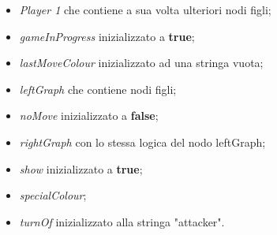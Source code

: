 \documentclass[a4paper,11pt,twoside,openright]{report}
\begin{document}
\begin{itemize}
\item \textit{Player 1} che contiene a sua volta ulteriori nodi figli;

\item \textit{gameInProgress} inizializzato a \textbf{true};

\item \textit{lastMoveColour} inizializzato ad una stringa vuota;

\item \textit{leftGraph} che contiene nodi figli;

\item \textit{noMove} inizializzato a \textbf{false};

\item \textit{rightGraph} con lo stessa logica del nodo leftGraph;

\item \textit{show} inizializzato a \textbf{true};

\item \textit{specialColour};

\item \textit{turnOf} inizializzato alla stringa "attacker".
\end{itemize}
\end{document}
